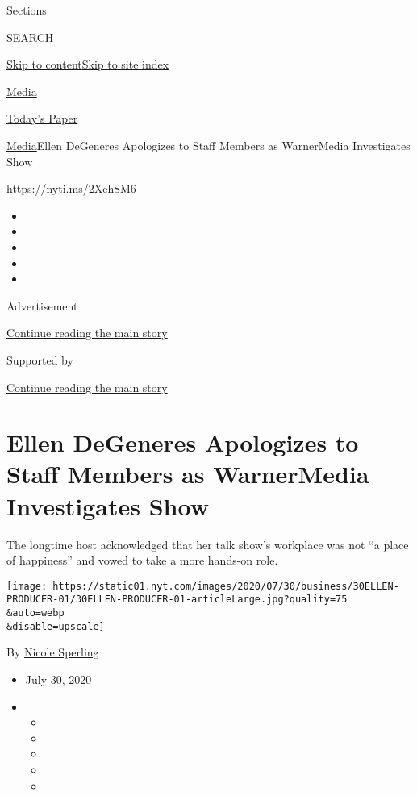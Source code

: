 Sections

SEARCH

\protect\hyperlink{site-content}{Skip to
content}\protect\hyperlink{site-index}{Skip to site index}

\href{https://www.nytimes.com/section/business/media}{Media}

\href{https://myaccount.nytimes.com/auth/login?response_type=cookie\&client_id=vi}{}

\href{https://www.nytimes.com/section/todayspaper}{Today's Paper}

\href{/section/business/media}{Media}\textbar{}Ellen DeGeneres
Apologizes to Staff Members as WarnerMedia Investigates Show

\url{https://nyti.ms/2XehSM6}

\begin{itemize}
\item
\item
\item
\item
\item
\end{itemize}

Advertisement

\protect\hyperlink{after-top}{Continue reading the main story}

Supported by

\protect\hyperlink{after-sponsor}{Continue reading the main story}

\hypertarget{ellen-degeneres-apologizes-to-staff-members-as-warnermedia-investigates-show}{%
\section{Ellen DeGeneres Apologizes to Staff Members as WarnerMedia
Investigates
Show}\label{ellen-degeneres-apologizes-to-staff-members-as-warnermedia-investigates-show}}

The longtime host acknowledged that her talk show's workplace was not
``a place of happiness'' and vowed to take a more hands-on role.

\texttt{[image: https://static01.nyt.com/images/2020/07/30/business/30ELLEN-PRODUCER-01/30ELLEN-PRODUCER-01-articleLarge.jpg?quality=75\\\&auto=webp\\\&disable=upscale]}

By \href{https://www.nytimes.com/by/nicole-sperling}{Nicole Sperling}

\begin{itemize}
\item
  July 30, 2020
\item
  \begin{itemize}
  \item
  \item
  \item
  \item
  \item
  \end{itemize}
\end{itemize}

